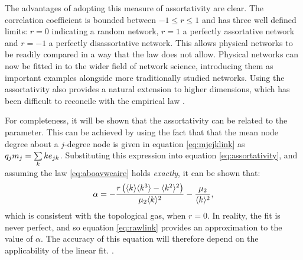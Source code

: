 The advantages of adopting this measure of assortativity are clear.
The correlation coefficient is bounded between $-1\leq r \leq 1$ and has three well defined limits: $r=0$ indicating a random network, $r=1$ a perfectly assortative network and $r=-1$ a perfectly disassortative network.
This allows physical networks to be readily compared in a way that the \aw{} law does not allow.
Physical networks can now be fitted in to the wider field of network science, introducing them as important examples alongside more traditionally studied networks.
Using the assortativity also provides a natural extension to higher dimensions, which has been difficult to reconcile with the empirical \aw{} law \cite{Mason2012}.

For completeness, it will be shown that the assortativity can be related to the \aw{} parameter.
This can be achieved by using the fact that that the mean node degree about a $j$-degree node is given in equation \eqref{eq:mjejklink} as $q_jm_j=\sum\limits_k ke_{jk}$.
Substituting this expression into equation \eqref{eq:assortativity}, and assuming the \aw{} law \eqref{eq:aboavweaire} holds \textit{exactly}, it can be shown that:
\begin{equation}
        \label{eq:rawlink}
        \alpha = - \frac{r\left(\langle k \rangle\langle k^3 \rangle-\langle k^2 \rangle^2\right)}{\mu_2\langle k \rangle^2}-\frac{\mu_2}{\langle k \rangle^2},
\end{equation}
which is consistent with the topological gas, when $r=0$.
In reality, the \aw{} fit is never perfect, and so equation \eqref{eq:rawlink} provides an approximation to the value of $\alpha$. 
The accuracy of this equation will therefore depend on the applicability of the linear fit.
.

